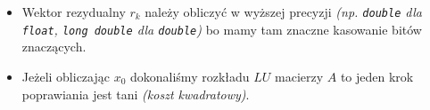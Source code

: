 \documentclass[../mn-notatki.tex]{subfiles}
\begin{document}
\begin{itemize}
    \item Wektor rezydualny $r_k$ należy obliczyć w wyższej precyzji
    \textit{(np. \texttt{double} dla \texttt{float}, \texttt{long double} dla
    \texttt{double})} bo mamy tam znaczne kasowanie bitów znaczących.
    \item Jeżeli obliczając $x_0$ dokonaliśmy rozkładu $LU$ macierzy $A$ to
    jeden krok poprawiania jest tani \textit{(koszt kwadratowy)}.
\end{itemize}


\pagebreak
\end{document}
